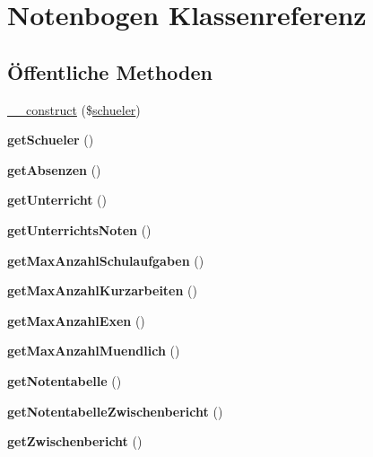 \hypertarget{class_notenbogen}{}\section{Notenbogen Klassenreferenz}
\label{class_notenbogen}
\subsection*{Öffentliche Methoden}
\begin{DoxyCompactItemize}
\item 
\mbox{\hyperlink{class_notenbogen_a937ed1b8ebe4d26007088dc4cdefd839}{\+\_\+\+\_\+construct}} (\$\mbox{\hyperlink{classschueler}{schueler}})
\item 
\mbox{\label{class_notenbogen_af7bc79603a6725d3780efaa7eee5c2f1}} 
{\bfseries get\+Schueler} ()
\item 
\mbox{\label{class_notenbogen_a32af8f9a4bd7a71550797066b37efbea}} 
{\bfseries get\+Absenzen} ()
\item 
\mbox{\label{class_notenbogen_a475f83b210cdb76888bda73f54bb5e4b}} 
{\bfseries get\+Unterricht} ()
\item 
\mbox{\label{class_notenbogen_abe935758005d155e1a7881d88276d35a}} 
{\bfseries get\+Unterrichts\+Noten} ()
\item 
\mbox{\label{class_notenbogen_af50c3a47e10d2d76bffb33f238f8ec08}} 
{\bfseries get\+Max\+Anzahl\+Schulaufgaben} ()
\item 
\mbox{\label{class_notenbogen_adf3b53fa46c64fb7ee201df88a9fe403}} 
{\bfseries get\+Max\+Anzahl\+Kurzarbeiten} ()
\item 
\mbox{\label{class_notenbogen_ad3e8ea12139ba1b5308b861cb70b4866}} 
{\bfseries get\+Max\+Anzahl\+Exen} ()
\item 
\mbox{\label{class_notenbogen_a6e7e2dbb5cba9fab06f45ec0d4eab9f9}} 
{\bfseries get\+Max\+Anzahl\+Muendlich} ()
\item 
\mbox{\label{class_notenbogen_a15bbdd28c38ed1fc10b1805c62b1d12d}} 
{\bfseries get\+Notentabelle} ()
\item 
\mbox{\label{class_notenbogen_af034d7e966610438cac1ea2e8a4ec451}} 
{\bfseries get\+Notentabelle\+Zwischenbericht} ()
\item 
\mbox{\label{class_notenbogen_a2ea7e01efaf1737e7962792b4caaaae6}} 
{\bfseries get\+Zwischenbericht} ()
\end{DoxyCompactItemize}


